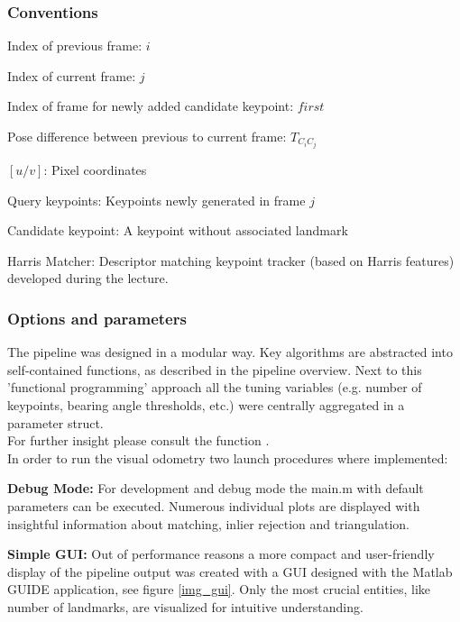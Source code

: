 %

\subsubsection{Conventions}
\begin{compactitem}
	\item Index of previous frame: $i$
	\item Index of current frame: $j$
	\item Index of frame for newly added candidate keypoint: $first$
	\item Pose difference between previous to current frame: $T_{C_iC_j}$
	\item $\left[u/v\right]$: Pixel coordinates
	\item Query keypoints: Keypoints newly generated in frame $j$ 
	\item Candidate keypoint: A keypoint without associated landmark
	\item Harris Matcher: Descriptor matching keypoint tracker (based on Harris features) developed during the lecture.
\end{compactitem}

\subsubsection{Options and parameters}
The pipeline was designed in a modular way. Key algorithms are abstracted into self-contained functions, as described in the pipeline overview. Next to this 'functional programming' approach all the tuning variables (e.g. number of keypoints, bearing angle thresholds, etc.) were centrally aggregated in a parameter struct.\\
For further insight please consult the function .\\

In order to run the visual odometry two launch procedures where implemented:
\begin{compactitem}
	\item \textbf{Debug Mode:} For development and debug mode the main.m with default 		parameters can be executed. Numerous individual plots are displayed with insightful 		information about matching, inlier rejection and triangulation.
	\item \textbf{Simple GUI:} Out of performance reasons a more compact and user-friendly display of the pipeline output was created with a GUI designed with the Matlab GUIDE application, see figure \cref{img_gui}. Only the most crucial entities, like number of landmarks, are visualized for intuitive understanding.\\
\end {compactitem}

